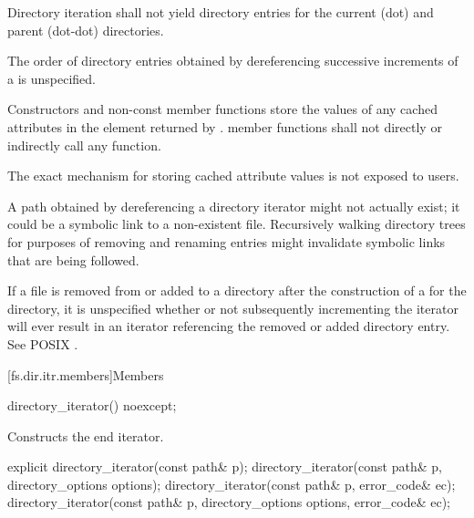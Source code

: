 \pnum
Directory iteration shall not yield directory entries for the current (dot)
and parent (dot-dot) directories.

\pnum
The order of directory entries obtained by dereferencing successive
increments of a  is unspecified.

\pnum
Constructors and non-const  member functions
store the values of any cached attributes
in the  element returned by .
 member functions shall not directly or indirectly call
any   function.
\begin{note}
The exact mechanism for storing cached attribute values is not exposed to users.
\end{note}

\pnum
\begin{note}
A path obtained by dereferencing a directory iterator might not actually exist;
it could be a symbolic link to a non-existent file.
Recursively walking directory trees
for purposes of removing and renaming entries
might invalidate symbolic links that are being followed.
\end{note}

\pnum
\begin{note}
If a file  is removed from or added to a directory after the
construction of a  for the directory, it is
unspecified whether or not subsequently incrementing the iterator will ever
result in an iterator referencing the removed or added directory entry. See
POSIX .
\end{note}

[fs.dir.itr.members]{Members}

%
\begin{itemdecl}
directory_iterator() noexcept;
\end{itemdecl}

\begin{itemdescr}
\pnum
\effects
Constructs the end iterator.
\end{itemdescr}

%
\begin{itemdecl}
explicit directory_iterator(const path& p);
directory_iterator(const path& p, directory_options options);
directory_iterator(const path& p, error_code& ec);
directory_iterator(const path& p, directory_options options, error_code& ec);
\end{itemdecl}

